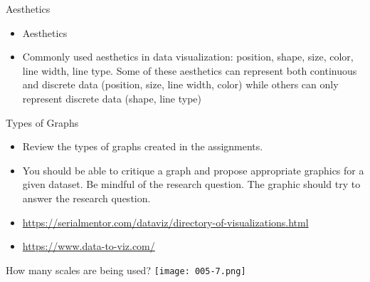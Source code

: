 \documentclass[10pt]{beamer}\usepackage[]{graphicx}\usepackage[]{color}
\begin{document}
\begin{frame}{Aesthetics}
	\begin{itemize}
		\setlength\itemsep{.51em}
		\item Aesthetics
		\pause 
		\item Commonly used aesthetics in data visualization: position, shape, size, color, line width, line type. Some of these aesthetics can represent both continuous and discrete data (position, size, line width, color) while others can only represent discrete data (shape, line type)	
	\end{itemize}
\end{frame}

\begin{frame}{Types of Graphs}
	\begin{itemize}
		\item Review the types of graphs created in the assignments.
		\item You should be able to critique a graph and propose appropriate graphics for a given dataset. Be mindful of the research question. The graphic should try to answer the research question. 
		\item \url{https://serialmentor.com/dataviz/directory-of-visualizations.html}
		\item \url{https://www.data-to-viz.com/}
	\end{itemize}
\end{frame}

\begin{frame}{How many scales are being used?}
	\centering
	\texttt{[image: 005-7.png]}
\end{frame}
\end{document}
